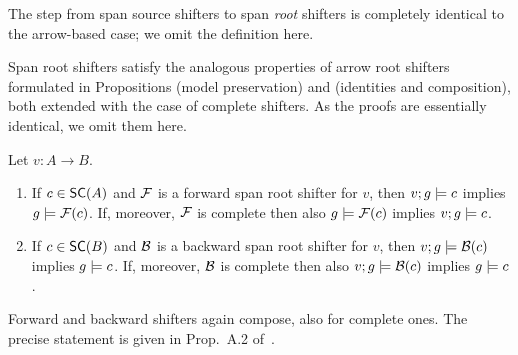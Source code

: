 \medskip\noindent
The step from span source shifters to span \emph{root} shifters is completely identical to the arrow-based case; we omit the definition here. 

%
Span root shifters satisfy the analogous properties of arrow root shifters formulated in Propositions  (model preservation) and  (identities and composition), both extended with the case of complete shifters. 
\iffull
As the proofs are essentially identical, we omit them here. 
\fi

\begin{proposition}
Let $v:A\to B$.
\begin{enumerate}[topsep=\smallskipamount]
\item If $c\in \SC A$ and $\mathcal{F}$ is a forward span root shifter for $v$, then $v;g\models c$ implies $g\models \mathcal{F}(c)$. If, moreover, $\mathcal{F}$ is complete then also $g\models \mathcal{F}(c)$ implies $v;g\models c$.
\item If $c\in \SC B$ and $\mathcal{B}$ is a backward span root shifter for $v$, then $v;g\models \mathcal{B}(c)$ implies $g\models c$. If, moreover, $\mathcal{B}$ is complete then also $v;g\models \mathcal{B}(c)$ implies $g\models c$.
\end{enumerate}
\end{proposition}
%
Forward and backward shifters again compose, also for complete ones.
\iffest
The precise statement is given in Prop.~A.2 of~\cite{RensinkCorradini-JPK2024-full}.
\fi

